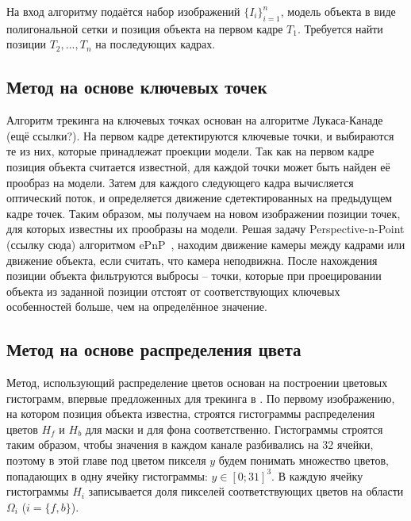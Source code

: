 На вход алгоритму подаётся набор изображений
$\{I_i\}_{i = 1}^n$,
модель объекта в виде полигональной сетки и позиция объекта на первом кадре
$T_1$.
Требуется найти позиции $T_2, ..., T_n$ на последующих кадрах.

\subsection{Метод на основе ключевых точек}


Алгоритм трекинга на ключевых точках основан на алгоритме
Лукаса-Канаде~\cite{LukasKanade} (ещё ссылки?).
На первом кадре детектируются ключевые точки, и выбираются те из них, которые
принадлежат проекции модели.
Так как на первом кадре позиция объекта считается известной, для каждой точки
может быть найден её прообраз на модели.
Затем для каждого следующего кадра вычисляется оптический поток, и определяется
движение сдетектированных на предыдущем кадре точек.
Таким образом, мы получаем на новом изображении позиции точек, для которых
известны их прообразы на модели.
Решая задачу Perspective-n-Point (ссылку сюда) алгоритмом ePnP~\cite{Lepetit},
находим движение камеры между кадрами или движение объекта, если считать, что
камера неподвижна.
После нахождения позиции объекта фильтруются выбросы -- точки,
которые при проецировании объекта из заданной позиции отстоят от
соответствующих ключевых особенностей больше, чем на определённое значение.

\subsection{Метод на основе распределения цвета}


Метод, использующий распределение цветов основан на построении цветовых
гистограмм, впервые предложенных для трекинга в \cite{Bibby2008}.
По первому изображению, на котором позиция объекта известна, строятся
гистограммы распределения цветов $H_f$ и $H_b$ для маски и для фона
соответственно.
Гистограммы строятся таким образом, чтобы значения в каждом канале разбивались
на 32 ячейки, поэтому в этой главе под цветом пикселя $y$ будем понимать
множество цветов, попадающих в одну ячейку гистограммы: $y \in [0; 31]^3$.
В каждую ячейку гистограммы $H_i$ записывается доля пикселей соответствующих
цветов на области $\Omega_i$ ($i = \{f, b\}$).

